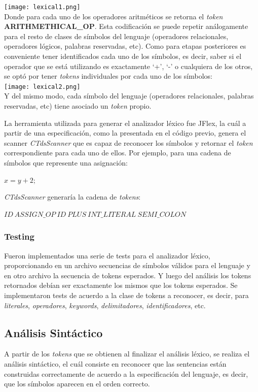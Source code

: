 \documentclass[11pt,a4paper]{article}
\begin{document}
\texttt{[image: lexical1.png]} \\ 
 
Donde para cada uno de los operadores aritméticos se retorna el \textit{token} \textbf{ARITHMETHICAL_OP}. Esta codificación se puede repetir análogamente para el resto de clases de símbolos del lenguaje (operadores relacionales, operadores lógicos, palabras reservadas, etc). Como para etapas posteriores es conveniente tener identificados cada uno de los símbolos, es decir, saber si el operador que se está utilizando es exactamente `+', `-' o cualquiera de los otros, se optó por tener \textit{tokens} individuales por cada uno de los símbolos:
\\

\texttt{[image: lexical2.png]} \\ 

Y del mismo modo, cada símbolo del lenguaje (operadores relacionales, palabras reservadas, etc) tiene asociado un \textit{token} propio.

La herramienta utilizada para generar el analizador léxico fue JFlex, la cuál a partir de una especificación, como la presentada en el código previo, genera el scanner \textit{CTdsScanner} que es capaz de reconocer los símbolos y retornar el \textit{token} correspondiente para cada uno de ellos. Por ejemplo, para una cadena de símbolos que represente una asignación:
\begin{center}
	$x = y+2 ;$
\end{center}
\textit{CTdsScanner} generaría la cadena de \textit{tokens}:
\begin{center}
	$ID \ ASSIGN\_OP \ ID \ PLUS \ INT\_LITERAL \ SEMI\_COLON$
\end{center}

\subsubsection{Testing}

Fueron implementados una serie de tests para el analizador léxico, proporcionando en un archivo secuencias de símbolos válidos para el lenguaje y en otro archivo la secuencia de tokens esperados. Y luego del análisis los tokens retornados debían ser exactamente los mismos que los tokens esperados. Se implementaron tests de acuerdo a la clase de tokens a reconocer, es decir, para \textit{literales}, \textit{operadores}, \textit{keywords}, \textit{delimitadores}, \textit{identificadores}, etc.

\subsection{Análisis Sintáctico} 
\label{subsec:sintactico}
A partir de los \textit{tokens} que se obtienen al finalizar el análisis léxico, se realiza el análisis sintáctico, el cuál consiste en reconocer que las sentencias están construidas correctamente de acuerdo a la especificación del lenguaje, es decir, que los símbolos aparecen en el orden correcto. 
\end{document}
